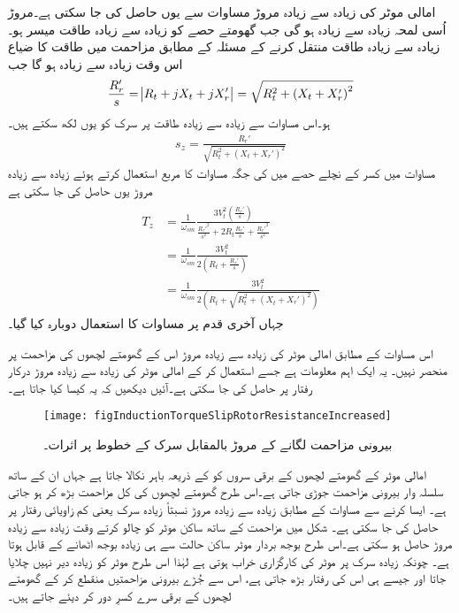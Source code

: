 امالی موٹر کی زیادہ سے زیادہ مروڑ مساوات   سے یوں حاصل کی جا سکتی ہے۔مروڑ اُسی لمحہ زیادہ سے زیادہ ہو گی جب گھومتے حصے کو زیادہ سے زیادہ طاقت میسر ہو۔زیادہ سے زیادہ طاقت منتقل کرنے کے مسئلہ کے مطابق مزاحمت  میں طاقت کا ضیاع اس وقت زیادہ سے زیادہ ہو گا جب
\begin{align}\label{مساوات_امالی_زیادہ_طاقت_منتقلی_شرط}
\frac{R_r'}{s}=\abs{R_t+j X_t+j X_r'}=\sqrt{R_t^2+\left(X_t+X_r'\right)^2}
\end{align}
ہو۔اس مساوات سے زیادہ سے زیادہ طاقت پر سرک  کو یوں لکھ سکتے ہیں۔
\begin{align}\label{مساوات_امالی_زیادہ_طاقت_پر_سرک}
s_z=\frac{R_r'}{\sqrt{R_t^2+\left(X_t+X_r'\right)^2}}
\end{align}
مساوات   میں کسر کے نچلے حصے میں  کی جگہ  مساوات   کا مربع استعمال کرتے ہوئے زیادہ سے زیادہ مروڑ  یوں حاصل کی جا سکتی ہے
\begin{gather}
\begin{aligned}
T_z&=\frac{1}{\omega_{sm}} \frac{3 V_t^2 \left(\frac{R_r'}{s} \right)}{\frac{R_r'^2}{s^2}+2 R_t \frac{R_r'}{s}+\frac{R_r'^2}{s^2}}\\
&=\frac{1}{\omega_{sm}} \frac{3 V_t^2 }{2 \left(R_t+\frac{R_r'}{s} \right)}\\
&=\frac{1}{\omega_{sm}} \frac{3 V_t^2}{2 \left(R_t+\sqrt{R_t^2+\left(X_t+X_r' \right)^2} \right)}
\end{aligned}
\end{gather}
جہاں آخری قدم پر مساوات کا استعمال دوبارہ کیا گیا۔

اس مساوات کے مطابق امالی موٹر کی زیادہ سے زیادہ مروڑ اس کے گھومتے لچھوں کی  مزاحمت پر منحصر نہیں۔ یہ ایک اہم معلومات ہے جسے استعمال کر کے امالی موٹر کی زیادہ سے زیادہ مروڑ درکار رفتار پر  حاصل کی جا سکتی ہے۔آئیں دیکھیں کہ یہ کیسا کیا جاتا ہے۔
\begin{figure}
\centering
\texttt{[image: figInductionTorqueSlipRotorResistanceIncreased]}
\caption{بیرونی مزاحمت لگانے کے مروڑ بالمقابل سرک کے خطوط پر اثرات۔}
\label{شکل_امالی_بیرونی_مزاحمت_اور_مروٹ}
\end{figure}

	امالی موٹر کے گھومتے لچھوں کے برقی سروں کو  کے ذریعہ باہر نکالا جاتا ہے جہاں ان کے ساتھ سلسلہ وار بیرونی مزاحمت جوڑی جاتی ہے۔اس طرح گھومتے لچھوں کی کل مزاحمت بڑھ کر  ہو جاتی ہے۔ ایسا کرنے سے مساوات   کے مطابق زیادہ سے زیادہ مروڑ نسبتاً زیادہ سرک یعنی کم زاویائی رفتار پر حاصل کی جا سکتی ہے۔ شکل  میں مزاحمت  کے ساتھ ساکن موٹر کو چالو کرتے وقت زیادہ سے زیادہ مروڑ حاصل ہو سکتی ہے۔اس طرح بوجھ بردار موٹر ساکن حالت سے ہی زیادہ بوجھ اٹھانے کے قابل ہوتا ہے۔ چونکہ زیادہ سرک پر موٹر کی کارگزاری خراب ہوتی ہے لہٰذا اس طرح موٹر کو زیادہ دیر نہیں چلایا جاتا اور جیسے ہی اس کی رفتار بڑھ جاتی ہے، اس سے جُڑے بیرونی مزاحمتیں منقطع کر کے گھومتے لچھوں کے برقی سرے کسرِ دور کر دیئے جاتے ہیں۔

